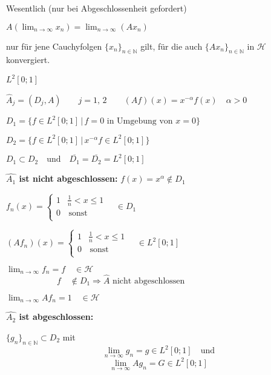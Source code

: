 \begin{Bem}
    Wesentlich (nur bei Abgeschlossenheit gefordert)

    $A( \lim_{n \rightarrow \infty} x_n) = \lim_{n \rightarrow \infty} (A x_n)$

    nur für jene Cauchyfolgen $\{ x_n\}_{n \in \mathbb{N}}$ gilt, für die auch 
    $\{ A x_n\}_{n \in \mathbb{N}}$ in $\mathcal{H}$ konvergiert.
\end{Bem}

\begin{Bsp}
    $L^2[0;1]$

    $\hat{A}_j = (D_j,A) \quad\quad j=1, \,2 \quad\quad (Af)(x) = x^{-\alpha} f(x) \quad \alpha >0 $

    $D_1 = \{ f \in L^2[0;1] \,|\, f = 0 \textrm{ in Umgebung von } x=0 \}$
    
    $D_2 = \{ f \in L^2[0;1] \,|\, x^{- \alpha} f \in L^2[0;1] \}$

    $D_1 \subset D_2 \quad \textrm{und} \quad \overline{D_1} = \overline{D_2} = L^2[0;1]$

    \textbf{$\hat{A_1}$ ist nicht abgeschlossen:} $f(x) = x^\alpha \notin D_1$
    \begin{addmargin}[25pt]{0pt}
        $f_n(x) = \left\{ \begin{array}{ll}
            1 & \frac{1}{n} < x \leq 1  \\
            0 & \, \textrm{sonst} \\
            \end{array}
            \right. \quad \in D_1$

        $(Af_n)(x) = \left\{ \begin{array}{ll}
            1 & \frac{1}{n} < x \leq 1  \\
            0 & \, \textrm{sonst} \\
            \end{array}
            \right. \quad \in L^2[0;1]$         
            
        $\lim_{n \rightarrow \infty} f_n = f \quad \in \mathcal{H}$\\
        $\textrm{  } \hspace{5em} \,\, f \quad \notin D_1 \Rightarrow \hat{A} \textrm{ nicht abgeschlossen}$

        $\lim_{n \rightarrow \infty} Af_n = 1 \quad \in \mathcal{H}$
    \end{addmargin}


    \textbf{$\hat{A_2}$ ist abgeschlossen:}
    \begin{addmargin}[25pt]{0pt}
        $\{g_n\}_{n \in \mathbb{N}} \subset D_2$ mit
        $$ \lim_{n \rightarrow \infty} g_n = g \in L^2[0;1] \quad \textrm{und}$$
        $$ \lim_{n \rightarrow \infty} Ag_n = G \in L^2[0;1]$$
        
    \end{addmargin}
\end{Bsp}
